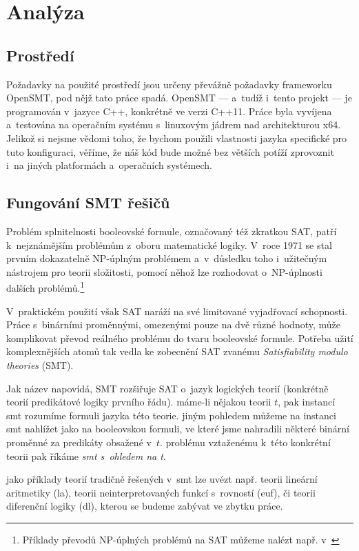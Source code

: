 \chapter{Analýza}

\section{Prostředí}

Požadavky na použité prostředí jsou určeny převážně požadavky frameworku OpenSMT, pod nějž tato práce spadá. OpenSMT --- a~tudíž i~tento projekt --- je programován v~jazyce C++, konkrétně ve verzi C++11. Práce byla vyvíjena a~testována na operačním systému s~linuxovým jádrem nad architekturou x64. Jelikož si nejsme vědomi toho, že bychom použili vlastnosti jazyka specifické pro tuto konfiguraci, věříme, že náš kód bude možné bez větších potíží zprovoznit i~na jiných platformách a~operačních systémech.

\section{Fungování SMT řešičů}\label{smt}

Problém splnitelnosti booleovské formule, označovaný též zkratkou SAT, patří k~nejznámějším problémům z~oboru matematické logiky. V~roce 1971 se stal prvním dokazatelně NP-úplným problémem \cite{Cook71} a~v~důsledku toho i~užitečným nástrojem pro teorii složitosti, pomocí něhož lze rozhodovat o~NP-úplnosti dalších problémů.\footnote{Příklady převodů NP-úplných problémů na SAT můžeme nalézt např. v~\cite[kapitola 19]{Mares17}}

V~praktickém použití však SAT naráží na své limitované vyjadřovací schopnosti. Práce s~binárními proměnnými, omezenými pouze na dvě různé hodnoty, může komplikovat převod reálného problému do tvaru booleovské formule. Potřeba užití komplexnějších atomů tak vedla ke zobecnění SAT zvanému \emph{Satisfiability modulo theories} (SMT).

Jak název napovídá, SMT rozšiřuje SAT o~jazyk logických teorií (konkrétně teorií predikátové logiky prvního řádu). máme-li nějakou teorii $t$, pak instancí smt rozumíme formuli jazyka této teorie. jiným pohledem můžeme na instanci smt nahlížet jako na booleovskou formuli, ve které jsme nahradili některé binární proměnné za predikáty obsažené v~$t$. problému vztaženému k~této konkrétní teorii pak říkáme \emph{smt s~ohledem na t}.

jako příklady teorií tradičně řešených v~smt lze uvézt např. teorii lineární aritmetiky (la), teorii neinterpretovaných funkcí s~rovností (euf), či teorii diferenční logiky (dl), kterou se budeme zabývat ve zbytku práce.

